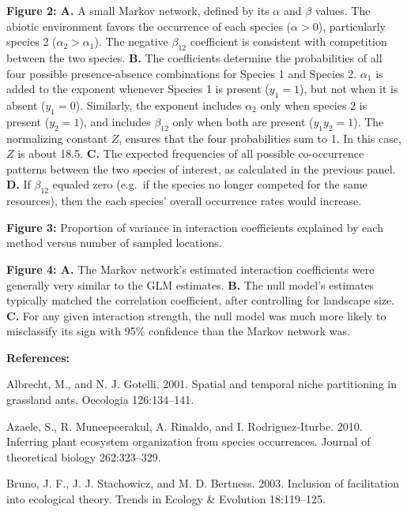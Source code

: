 \documentclass[12pt,]{article}
\begin{document}
\begin{spacing}{1.9}
\begin{flushleft}
\noindent \textbf{Figure 2: A.} A small Markov network, defined by its
\(\alpha\) and \(\beta\) values. The abiotic environment favors the
occurrence of each species (\(\alpha >0\)), particularly species 2
(\(\alpha_2 > \alpha_1\)). The negative \(\beta_12\) coefficient is
consistent with competition between the two species. \textbf{B.} The
coefficients determine the probabilities of all four possible
presence-absence combinations for Species 1 and Species 2. \(\alpha_1\)
is added to the exponent whenever Species 1 is present (\(y_1 = 1\)),
but not when it is absent (\(y_1 = 0\)). Similarly, the exponent
includes \(\alpha_2\) only when species \(2\) is present (\(y_2 = 1\)),
and includes \(\beta_12\) only when both are present (\(y_1y_2 = 1\)).
The normalizing constant \(Z\), ensures that the four probabilities sum
to 1. In this case, \(Z\) is about 18.5. \textbf{C.} The expected
frequencies of all possible co-occurrence patterns between the two
species of interest, as calculated in the previous panel. \textbf{D.} If
\(\beta_{12}\) equaled zero (e.g.~if the species no longer competed for
the same resources), then the each species' overall occurrence rates
would increase.

\noindent \textbf{Figure 3:} Proportion of variance in interaction
coefficients explained by each method versus number of sampled
locations.

\noindent \textbf{Figure 4: A.} The Markov network's estimated
interaction coefficients were generally very similar to the GLM
estimates. \textbf{B.} The null model's estimates typically matched the
correlation coefficient, after controlling for landscape size.
\textbf{C.} For any given interaction strength, the null model was much
more likely to misclassify its sign with 95\% confidence than the Markov
network was.

\noindent \textbf{References:}

\setlength{\parindent}{-1em} \setlength{\leftskip}{1em}

Albrecht, M., and N. J. Gotelli. 2001. Spatial and temporal niche
partitioning in grassland ants. Oecologia 126:134--141.

Azaele, S., R. Muneepeerakul, A. Rinaldo, and I. Rodriguez-Iturbe. 2010.
Inferring plant ecosystem organization from species occurrences. Journal
of theoretical biology 262:323--329.

Bruno, J. F., J. J. Stachowicz, and M. D. Bertness. 2003. Inclusion of
facilitation into ecological theory. Trends in Ecology \& Evolution
18:119--125.


\end{flushleft}
\end{spacing}
\end{document}
